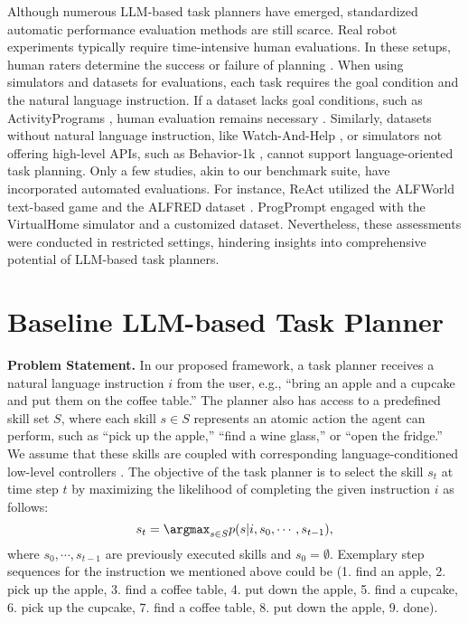 Although numerous LLM-based task planners have emerged, standardized automatic performance evaluation methods are still scarce. Real robot experiments typically require time-intensive human evaluations. In these setups, human raters determine the success or failure of planning \citep{ahn2023do, huang2023inner, chen2023open}. When using simulators and datasets for evaluations, each task requires the goal condition and the natural language instruction. If a dataset lacks goal conditions, such as ActivityPrograms \citep{puig2018virtualhome}, human evaluation remains necessary \citep{huang2022language, zelikman2022parsel}. Similarly, datasets without natural language instruction, like Watch-And-Help \citep{puig2021watchandhelp}, or simulators not offering high-level APIs, such as Behavior-1k \citep{li2023behavior}, cannot support language-oriented task planning. Only a few studies, akin to our benchmark suite, have incorporated automated evaluations. For instance, ReAct \citep{yao2023react} utilized the ALFWorld \citep{shridhar2021alfworld} text-based game and the ALFRED dataset \citep{shridhar2020alfred}. ProgPrompt \citep{singh2023progprompt} engaged with the VirtualHome simulator and a customized dataset. Nevertheless, these assessments were conducted in restricted settings, hindering insights into comprehensive potential of LLM-based task planners.

\section{Baseline LLM-based Task Planner}
\label{sec:baseline_task_planner}
\textbf{Problem Statement.} In our proposed framework, a task planner receives a natural language instruction $i$ from the user, e.g., ``bring an apple and a cupcake and put them on the coffee table.'' The planner also has access to a predefined skill set $S$, where each skill $s{\in}S$ represents an atomic action the agent can perform, such as ``pick up the apple,'' ``find a wine glass,'' or ``open the fridge.'' We assume that these skills are coupled with corresponding language-conditioned low-level controllers \citep{jang2022bc,rt1}. The objective of the task planner is to select the skill $s_t$ at time step $t$ by maximizing the likelihood of completing the given instruction $i$ as follows:
\begin{equation}
\label{eq:probability_tp}
s_t = \argmax_{s \in S} p(s | i, s_0, \cdots, s_{t-1}),
\end{equation}
where $s_0, \cdots, s_{t-1}$ are previously executed skills and $s_0 = \emptyset$. 
Exemplary step sequences for the instruction we mentioned above could be (1. find an apple, 2. pick up the apple, 3. find a coffee table, 4. put down the apple, 5. find a cupcake, 6. pick up the cupcake, 7. find a coffee table, 8. put down the apple, 9. done).

